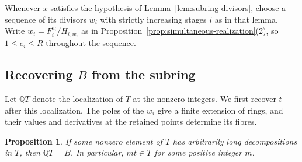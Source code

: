 \documentclass{article}
\newtheorem{proposition}{Proposition}[section]
\theoremstyle{remark}
\begin{document}
Whenever $x$ satisfies the hypothesis of Lemma~\ref{lem:subring-divisors}, choose a sequence of its divisors $w_i$ with strictly increasing stages $i$ as in that lemma.
Write $w_i = F_i^{e_i}/H_{i, w_i}$ as in Proposition~\ref{prop:simultaneous-realization}(2), so $1 \le e_i \le R$ throughout the sequence.

\subsection{Recovering \texorpdfstring{$B$}{B} from the subring}

Let $\mathbb{Q}T$ denote the localization of $T$ at the nonzero integers.
We first recover $t$ after this localization.
The poles of the $w_i$ give a finite extension of rings, and their values and derivatives at the retained points determine its fibres.

\begin{proposition}
    \label{prop:subring-rational-algebra}
    If some nonzero element of $T$ has arbitrarily long decompositions in $T$, then $\mathbb{Q}T = B$.
    In particular, $mt \in T$ for some positive integer $m$.
\end{proposition}
\end{document}
